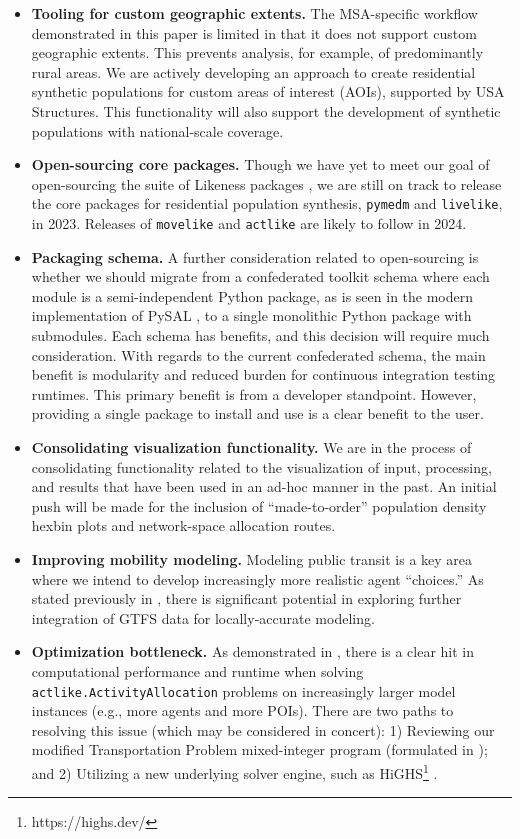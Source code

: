\begin{itemize}
    \item \textbf{Tooling for custom geographic extents.} The MSA-specific workflow demonstrated in this paper is limited in that it does not support custom geographic extents. This prevents analysis, for example, of predominantly rural areas.
    We are actively developing an approach to create residential synthetic populations for custom areas of interest (AOIs), supported by USA Structures. This functionality will also support the development of synthetic populations with national-scale coverage.
    \item \textbf{Open-sourcing core packages.} Though we have yet to meet our goal of open-sourcing the suite of Likeness packages \cite{likeness-scipy-paper-2022}, we are still on track to release the core packages for residential population synthesis, \texttt{pymedm} and \texttt{livelike}, in 2023. Releases of \texttt{movelike} and \texttt{actlike} are likely to follow in 2024.
    \item \textbf{Packaging schema.} A further consideration related to open-sourcing is whether we should migrate from a confederated toolkit schema where each module is a semi-independent Python package, as is seen in the modern implementation of PySAL \cite{pysal_GA_2022}, to a single monolithic Python package with submodules. Each schema has benefits, and this decision will require much consideration. With regards to the current confederated schema, the main benefit is modularity and reduced burden for continuous integration testing runtimes. This primary benefit is from a developer standpoint. However, providing a single package to install and use is a clear benefit to the user.
    \item \textbf{Consolidating visualization functionality.} We are in the process of consolidating functionality related to the visualization of input, processing, and results that have been used in an ad-hoc manner in the past. An initial push will be made for the inclusion of ``made-to-order'' population density hexbin plots and network-space allocation routes.
    \item \textbf{Improving mobility modeling.} Modeling public transit is a key area where we intend to develop increasingly more realistic agent ``choices.'' As stated previously in , there is significant potential in exploring further integration of GTFS data for locally-accurate modeling.
    \item \textbf{Optimization bottleneck.} As demonstrated in , there is a clear hit in computational performance and runtime when solving  \texttt{actlike.ActivityAllocation} problems on increasingly larger model instances (e.g., more agents and more POIs). There are two paths to resolving this issue (which may be considered in concert): 1) Reviewing our modified Transportation Problem mixed-integer program (formulated in \cite{likeness-scipy-paper-2022}); and 2) Utilizing a new underlying solver engine, such as HiGHS\footnote{https://highs.dev/} \cite{highs_mpc_2018}.

\end{itemize}
